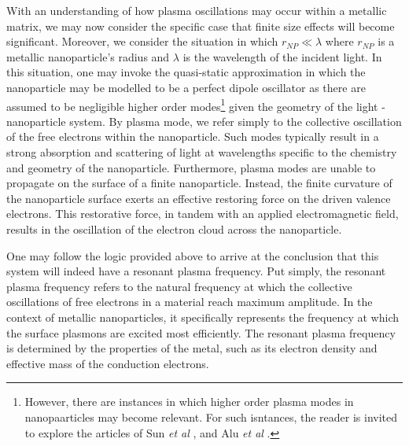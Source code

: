 With an understanding of how plasma oscillations may occur within a metallic matrix, we may now consider the specific case that finite size effects will become significant. Moreover, we consider the situation in which $r_{NP} \ll \lambda$ where $r_{NP}$ is a metallic nanoparticle's radius and $\lambda$ is the wavelength of the incident light. In this situation, one may invoke the quasi-static approximation in which the nanoparticle may be modelled to be a perfect dipole oscillator as there are assumed to be negligible higher order modes\footnote{However, there are instances in which higher order plasma modes in nanopaarticles may become relevant. For such isntances, the reader is invited to explore the articles of Sun \textit{et al} \cite{10.1063/1.3250160}, and Alu \textit{et al} \cite{Alu:07}.} given the geometry of the light - nanoparticle system. By plasma mode, we refer simply to the collective oscillation of the free electrons within the nanoparticle. Such modes typically result in a strong absorption and scattering of light at wavelengths specific to the chemistry and geometry of the nanoparticle. Furthermore, plasma modes are unable to propagate on the surface of a finite nanoparticle. Instead, the finite curvature of the nanoparticle surface exerts an effective restoring force on the driven valence electrons. This restorative force, in tandem with an applied electromagnetic field, results in the oscillation of the electron cloud across the nanoparticle. 

One may follow the logic provided above to arrive at the conclusion that this system will indeed have a resonant plasma frequency. Put simply, the resonant plasma frequency refers to the natural frequency at which the collective oscillations of free electrons in a material reach maximum amplitude. In the context of metallic nanoparticles, it specifically represents the frequency at which the surface plasmons are excited most efficiently. The resonant plasma frequency is determined by the properties of the metal, such as its electron density and effective mass of the conduction electrons. 

